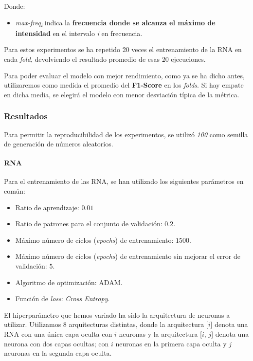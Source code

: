 \documentclass[12pt]{article}
\begin{document}
\newpage
\hphantom{skip}
\newpage
Donde:
\begin{itemize}
	\item \textit{max-freq\textsubscript{i}} indica la \textbf{frecuencia donde se alcanza el máximo de intensidad} en el intervalo \textit{i} en frecuencia.
\end{itemize}

Para estos experimentos se ha repetido 20 veces el entrenamiento de la RNA en cada \textit{fold}, devolviendo el resultado promedio de esas 20 ejecuciones.

\bigskip
Para poder evaluar el modelo con mejor rendimiento, como ya se ha dicho antes, utilizaremos como medida el promedio
del \textbf{F1-Score} en los \textit{folds}. Si hay empate en dicha media, se elegirá el modelo con menor
desviación típica de la métrica.


\newpage
\subsubsection{Resultados}
Para permitir la reproducibilidad de los experimentos, se utilizó \textit{100} como semilla de generación de números
aleatorios.

\paragraph{RNA}

Para el entrenamiento de las RNA, se han utilizado los siguientes parámetros en común:
\begin{itemize}
	\item Ratio de aprendizaje: $0.01$
	\item Ratio de patrones para el conjunto de validación: $0.2$.
	\item Máximo número de ciclos (\textit{epochs}) de entrenamiento: $1500$.
	\item Máximo número de ciclos (\textit{epochs}) de entrenamiento sin mejorar el error de validación: $5$.
	\item Algoritmo de optimización: ADAM.
	\item Función de \textit{loss}: \textit{Cross Entropy}.
\end{itemize}
El hiperparámetro que hemos variado ha sido la arquitectura de neuronas a utilizar. Utilizamos 8 arquitecturas distintas,
donde la arquitectura [$i$] denota una RNA con una única capa oculta con $i$ neuronas y la arquitectura [$i$, $j$] 
denota una neurona con dos capas ocultas; con $i$ neuronas en la primera capa oculta y $j$ neuronas en la segunda capa oculta.
\end{document}

